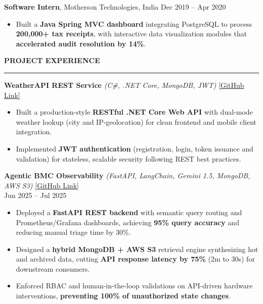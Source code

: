 \documentclass[letterpaper,10.5pt]{extarticle}
\newcommand{\resumesection}[1]{%
    \vspace{6pt}%
    \noindent\textbf{#1}\vspace{-5pt}%
    \\\noindent\rule{\textwidth}{0.5pt}%
    \vspace{1pt}%
}
\begin{document}
\vspace{3pt}

\noindent\textbf{Software Intern}, Motherson Technologies, India \hfill Dec 2019 -- Apr 2020

\begin{itemize}[leftmargin=12pt, topsep=1pt, itemsep=0pt, parsep=0pt]
    \item Built a \textbf{Java Spring MVC dashboard} integrating PostgreSQL to process \textbf{200,000+ tax receipts}, with interactive data visualization modules that \textbf{accelerated audit resolution by 14\%}.
\end{itemize}

\resumesection{PROJECT EXPERIENCE}

\noindent\textbf{WeatherAPI REST Service} \textit{(C\#, .NET Core, MongoDB, JWT)} \hfill \href{https://github.com/slowloris-98/WeatherAPI}{[GitHub Link]}

\begin{itemize}[leftmargin=12pt, topsep=1pt, itemsep=0pt, parsep=0pt]
    \item Built a production-style \textbf{RESTful .NET Core Web API} with dual-mode weather lookup (city and IP-geolocation) for clean frontend and mobile client integration.
    \item Implemented \textbf{JWT authentication} (registration, login, token issuance and validation) for stateless, scalable security following REST best practices.
\end{itemize}

\vspace{2pt}

\noindent\textbf{Agentic BMC Observability} \textit{(FastAPI, LangChain, Gemini 1.5, MongoDB, AWS S3)} \hfill \href{https://github.com/slowloris-98/Agentic-Oberservability-BMC}{[GitHub Link]}\\
Jun 2025 -- Jul 2025

\begin{itemize}[leftmargin=12pt, topsep=1pt, itemsep=0pt, parsep=0pt]
    \item Deployed a \textbf{FastAPI REST backend} with semantic query routing and Prometheus/Grafana dashboards, achieving \textbf{95\% query accuracy} and reducing manual triage time by 30\%.
    \item Designed a \textbf{hybrid MongoDB + AWS S3} retrieval engine synthesizing hot and archived data, cutting \textbf{API response latency by 75\%} (2m to 30s) for downstream consumers.
    \item Enforced RBAC and human-in-the-loop validations on API-driven hardware interventions, \textbf{preventing 100\% of unauthorized state changes}.
\end{itemize}
\end{document}
